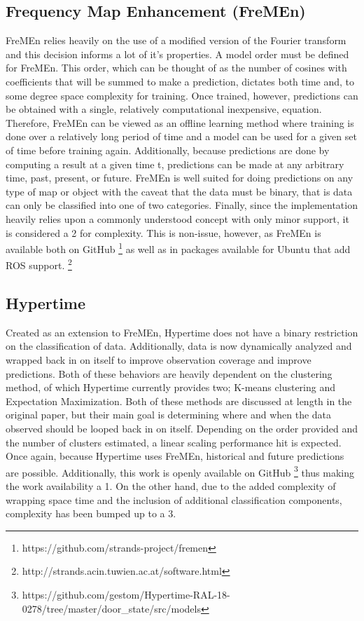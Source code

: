   \subsection { Frequency Map Enhancement (FreMEn) }
  FreMEn relies heavily on the use of a modified version of the Fourier
  transform and this decision informs a lot of it's properties. A model order must
  be defined for FreMEn. This order, which can be thought of as the number of
  cosines with coefficients that will be summed to make a prediction, dictates
  both time and, to some degree space complexity for training. Once trained,
  however, predictions can be obtained with a single, relatively computational
  inexpensive, equation. Therefore, FreMEn can be
  viewed as an offline learning method where training is done over a relatively
  long period of time and a model can be used for a given set of time before
  training again. Additionally, because predictions are done by computing a
  result at a given time t, predictions can be made at any arbitrary time,
  past, present, or future. FreMEn is well suited for doing predictions on any type
  of map or object with the caveat that the data must be binary, that is
  data can only be classified into one of two categories. Finally, since the
  implementation heavily relies upon a commonly understood concept with only
  minor support, it is considered a 2 for complexity. This is non-issue,
  however, as FreMEn is available both on
  GitHub \footnote[0]{https://github.com/strands-project/fremen}
  as well as in packages available for Ubuntu that add ROS
  support. \footnote[1]{http://strands.acin.tuwien.ac.at/software.html}


  \subsection { Hypertime }

  Created as an extension to FreMEn, Hypertime does not have a binary restriction
  on the classification of data. Additionally, data is now dynamically analyzed
  and wrapped back in on itself to improve observation coverage and improve
  predictions. Both of these behaviors are heavily dependent on the clustering
  method, of which Hypertime currently provides two; K-means clustering and
  Expectation Maximization. Both of these methods are discussed at length in
  the original paper, but their main goal is determining where and when the data observed
  should be looped back in on itself. Depending on the order provided and the
  number of clusters estimated, a linear scaling performance hit is expected.
  Once again, because Hypertime uses FreMEn, historical and future predictions
  are possible. Additionally, this work is openly available on GitHub
  \footnote[2]{https://github.com/gestom/Hypertime-RAL-18-0278/tree/master/door\_state/src/models}
  thus making the work availability a 1. On the other hand, due to the added
  complexity of wrapping space time and the inclusion of additional classification
  components, complexity has been bumped up to a 3.

